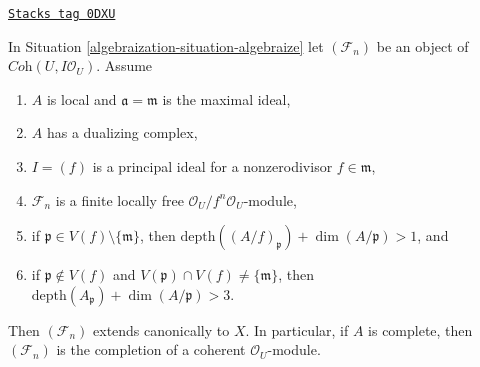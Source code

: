 \begin{lemma}
\label{algebraization-lemma-algebraization-principal}
\href{https://stacks.math.columbia.edu/tag/0DXU}{\texttt{Stacks tag 0DXU}}

In Situation \ref{algebraization-situation-algebraize} let $(\mathcal{F}_n)$ be an object
of $\textit{Coh}(U, I\mathcal{O}_U)$. Assume
\begin{enumerate}
\item $A$ is local and $\mathfrak a = \mathfrak m$ is the maximal ideal,
\item $A$ has a dualizing complex,
\item $I = (f)$ is a principal ideal for a nonzerodivisor $f \in \mathfrak m$,
\item $\mathcal{F}_n$ is a finite locally free
$\mathcal{O}_U/f^n\mathcal{O}_U$-module,
\item if $\mathfrak p \in V(f) \setminus \{\mathfrak m\}$, then
$\text{depth}((A/f)_\mathfrak p) + \dim(A/\mathfrak p) > 1$, and
\item if $\mathfrak p \not \in V(f)$ and
$V(\mathfrak p) \cap V(f) \not = \{\mathfrak m\}$, then
$\text{depth}(A_\mathfrak p) + \dim(A/\mathfrak p) > 3$.
\end{enumerate}
Then $(\mathcal{F}_n)$ extends canonically to $X$. In particular, if $A$
is complete, then $(\mathcal{F}_n)$ is the completion of a coherent
$\mathcal{O}_U$-module.
\end{lemma}

